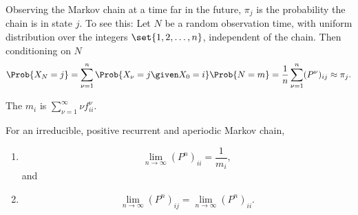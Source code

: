 \documentclass[12pt]{article}
\begin{document}
\begin{enumerate}
\begin{remark}
    Observing the Markov chain at a time far in the future, \( \pi_j \)
    is the probability the chain is in state \( j \).  To see this:  Let
    \( N \) be a random observation time, with uniform distribution over
    the integers \( \set{1, 2, \dots, n} \), independent of the chain.
    Then conditioning on \( N \)
    \[
        \Prob{X_N = j} = \sum\limits_{\nu=1}^n \Prob{X_{\nu} = j \given
        X_0 = i} \Prob{N = m} = \frac{1}{n} \sum\limits_{\nu=1}^n (P^{\nu})_
        {ij} \approx \pi_j.
    \]
\end{remark}

\begin{definition}
    The  \( m_i \) is \( \sum_{\nu=1}^\infty
    \nu f^\nu_{ii} \).
\end{definition}

\begin{theorem}
    For an irreducible, positive recurrent and aperiodic Markov chain,
    \begin{enumerate}
        \item
            \[
                \lim_{n \to \infty} (P^{n})_{ii} = \frac{1}{m_i},
            \] and
        \item
            \[
                \lim_{n \to \infty} (P^{n})_{ij} = \lim_{n \to \infty} (P^
                {n})_{ii}.
            \]
    \end{enumerate}
\end{theorem}


\end{enumerate}
\end{document}
